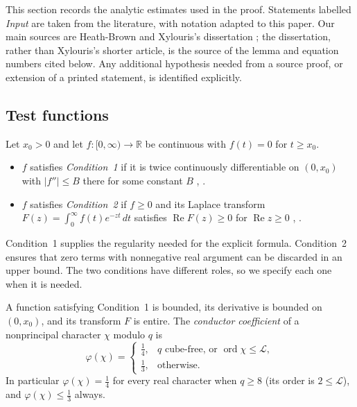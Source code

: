 \documentclass[11pt]{amsart}
\numberwithin{equation}{section}
\theoremstyle{plain}
\theoremstyle{definition}
\theoremstyle{remark}
\newcommand{\LL}{\mathcal{L}}
\newcommand{\RR}{\mathbb{R}}
\renewcommand{\Re}{\operatorname{Re}}
\newcommand{\1}{\mathbf{1}}
\DeclareMathOperator{\ord}{ord}
\begin{document}
This section records the analytic estimates used in the proof. Statements labelled
\emph{Input} are taken from the literature, with notation adapted to this paper. Our main
sources are Heath-Brown \cite{HeathBrown1992zero} and Xylouris's dissertation
\cite{Xylouris2011nullstellen}; the dissertation, rather than Xylouris's shorter article,
is the source of the lemma and equation numbers cited below. Any additional hypothesis
needed from a source proof, or extension of a printed statement, is identified explicitly.

\subsection{Test functions}

\begin{definition}\label{def:conditions}
Let $x_0>0$ and let $f:[0,\infty)\to\RR$ be continuous with $f(t)=0$ for $t\ge x_0$.
\begin{itemize}
  \item $f$ satisfies \emph{Condition~1} if it is twice continuously differentiable on
    $(0,x_0)$ with $|f''|\le B$ there for some constant $B$
    \cite[p.~280]{HeathBrown1992zero}, \cite[Bedingung~1, p.~17]{Xylouris2011nullstellen}.
  \item $f$ satisfies \emph{Condition~2} if $f\ge0$ and its Laplace transform
    $F(z)=\int_0^\infty f(t)e^{-zt}\,dt$ satisfies $\Re F(z)\ge0$ for $\Re z\ge0$
    \cite[p.~286]{HeathBrown1992zero}, \cite[Bedingung~2, p.~18]{Xylouris2011nullstellen}.
\end{itemize}
\end{definition}

Condition~1 supplies the regularity needed for the explicit formula. Condition~2 ensures
that zero terms with nonnegative real argument can be discarded in an upper bound.
The two conditions have different roles, so we specify each one when it is needed.

A function satisfying Condition~1 is bounded, its derivative is bounded on $(0,x_0)$, and its
transform $F$ is entire. The \emph{conductor coefficient} of a nonprincipal character $\chi$ modulo
$q$ is \cite[p.~17]{Xylouris2011nullstellen}
\[
  \varphi(\chi)=\begin{cases}\frac14,& q\text{ cube-free, or }\ord\chi\le\LL,\\[2pt]
  \frac13,&\text{otherwise.}\end{cases}
\]
In particular $\varphi(\chi)=\frac14$ for every real character when $q\ge8$ (its order is $2\le\LL$), and
$\varphi(\chi)\le\frac13$ always.
\end{document}
